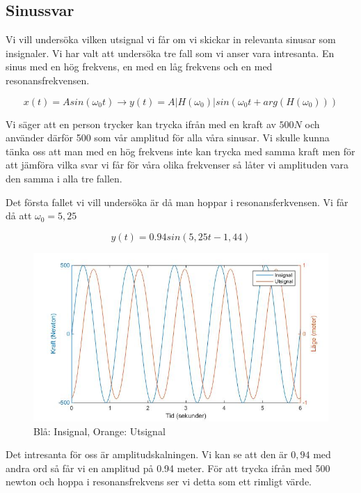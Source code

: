 \documentclass[10pt,a4paper]{article}
\begin{document}
\subsection{Sinussvar}
Vi vill undersöka vilken utsignal vi får om vi skickar in relevanta sinusar som insignaler. Vi har valt att undersöka tre fall som vi anser vara intresanta. En sinus med en hög frekvens, en med en låg frekvens och en med resonansfrekvensen.

\begin{equation}
x(t) = A sin(\omega_0t) \rightarrow y(t) = A|H(\omega_0)|sin(\omega_0t + arg(H(\omega_0)))
\end{equation}

Vi säger att en person trycker kan trycka ifrån med en kraft av $500N$ och använder därför 500 som vår amplitud för alla våra sinusar. Vi skulle kunna tänka oss att man med en hög frekvens inte kan trycka med samma kraft men för att jämföra vilka svar vi får för våra olika frekvenser så låter vi amplituden vara den samma i alla tre fallen.

Det första fallet vi vill undersöka är då man hoppar i resonansferkvensen. Vi får då att $\omega_0 = 5,25$

\begin{equation}
y(t) = 0.94 sin(5,25 t - 1,44)
\end{equation}

\begin{figure}[h]
\begin{center}
\includegraphics[scale=0.4]{sinussvar1}
\caption{Blå: Insignal, Orange: Utsignal}
\end{center}
\end{figure}

Det intresanta för oss är amplitudskalningen. Vi kan se att den är $0,94$ med andra ord så får vi en amplitud på 0.94 meter. För att trycka ifrån med 500 newton och hoppa i resonansfrekvens ser vi detta som ett rimligt värde.
\end{document}

